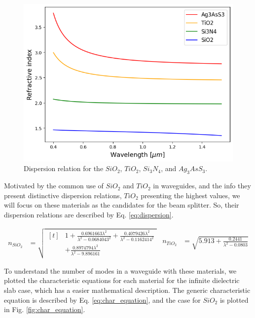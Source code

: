 \documentclass[conference, a4paper]{IEEEtran}
\begin{document}
\begin{figure}[H]
    \centering
    \includegraphics[scale=0.4]{dispersion_relation.png}
    \caption{Dispersion relation for the $SiO_2$, $TiO_2$, $Si_3N_4$, and $Ag_3AsS_3$.}
    \label{fig:dispersion}
\end{figure}

Motivated by the common use of $SiO_2$ and $TiO_2$ in waveguides, and the info they present distinctive dispersion relations, $TiO_2$ presenting the highest values, we will focus on these materials as the candidates for the beam splitter. So, their dispersion relations are described by Eq. \eqref{eq:dispersion}.

\begin{subequations}
    \begin{align}
        n_{SiO_2} &= 
        \sqrt{\begin{aligned}[t]
            &1 + \frac{0.6961663 \lambda^2}{\lambda^2 - 0.0684043^2} 
            + \frac{0.4079426 \lambda^2}{\lambda^2 - 0.1162414^2} \\
            &+ \frac{0.8974794 \lambda^2}{\lambda^2 - 9.896161}
        \end{aligned}}
    \end{align}
    \begin{align}
        n_{TiO_2} &= \sqrt{5.913 + \frac{0.2441}{\lambda^2 - 0.0803}}
    \end{align}
    \label{eq:dispersion}
\end{subequations}

To understand the number of modes in a waveguide with these materials, we plotted the characteristic equations for each material for the infinite dielectric slab case, which has a easier mathematical description. The generic characteristic equation is described by Eq. \eqref{eq:char_equation}, and the case for $SiO_2$ is plotted in Fig. \ref{fig:char_equation}.
\end{document}
